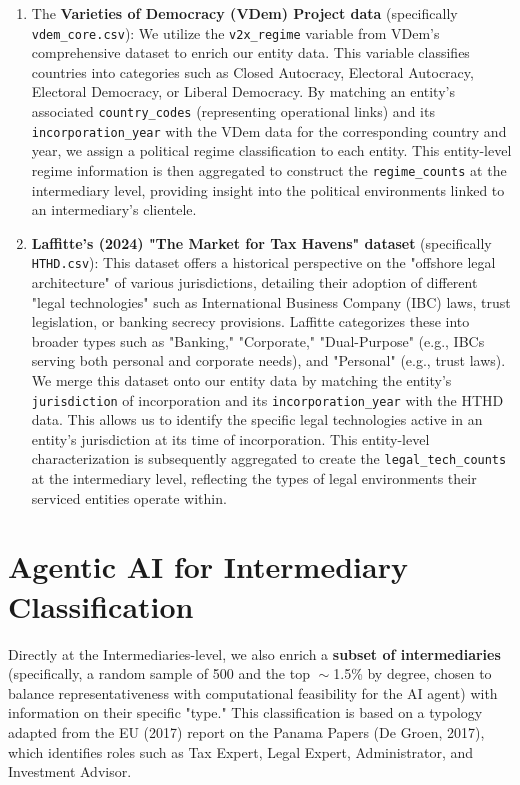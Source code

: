 \begin{enumerate}
  \item The \textbf{Varieties of Democracy (VDem) Project data} (specifically \texttt{vdem\_core.csv}): We utilize the \texttt{v2x\_regime} variable from VDem's comprehensive dataset to enrich our entity data. This variable classifies countries into categories such as Closed Autocracy, Electoral Autocracy, Electoral Democracy, or Liberal Democracy. By matching an entity's associated \texttt{country\_codes} (representing operational links) and its \texttt{incorporation\_year} with the VDem data for the corresponding country and year, we assign a political regime classification to each entity. This entity-level regime information is then aggregated to construct the \texttt{regime\_counts} at the intermediary level, providing insight into the political environments linked to an intermediary's clientele.
  
  \item \textbf{Laffitte's (2024) "The Market for Tax Havens" dataset} (specifically \texttt{HTHD.csv}): This dataset offers a historical perspective on the "offshore legal architecture" of various jurisdictions, detailing their adoption of different "legal technologies" such as International Business Company (IBC) laws, trust legislation, or banking secrecy provisions. Laffitte categorizes these into broader types such as "Banking," "Corporate," "Dual-Purpose" (e.g., IBCs serving both personal and corporate needs), and "Personal" (e.g., trust laws). We merge this dataset onto our entity data by matching the entity's \texttt{jurisdiction} of incorporation and its \texttt{incorporation\_year} with the HTHD data. This allows us to identify the specific legal technologies active in an entity's jurisdiction at its time of incorporation. This entity-level characterization is subsequently aggregated to create the \texttt{legal\_tech\_counts} at the intermediary level, reflecting the types of legal environments their serviced entities operate within.
\end{enumerate}

\section{Agentic AI for Intermediary Classification}
\label{sec:3_3}

Directly at the Intermediaries-level, we also enrich a \textbf{subset of intermediaries} (specifically, a random sample of 500 and the top $\sim$1.5\% by degree, chosen to balance representativeness with computational feasibility for the AI agent) with information on their specific "type." This classification is based on a typology adapted from the EU (2017) report on the Panama Papers (De Groen, 2017), which identifies roles such as Tax Expert, Legal Expert, Administrator, and Investment Advisor.


